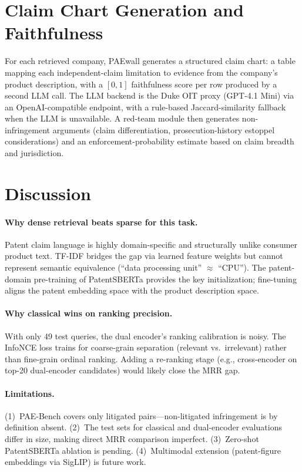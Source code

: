 \documentclass[11pt]{article}
\begin{document}
\section{Claim Chart Generation and Faithfulness}

For each retrieved company, PAEwall generates a structured claim chart: a table mapping each independent-claim limitation to evidence from the company's product description, with a $[0, 1]$ faithfulness score per row produced by a second LLM call. The LLM backend is the Duke OIT proxy (GPT-4.1 Mini) via an OpenAI-compatible endpoint, with a rule-based Jaccard-similarity fallback when the LLM is unavailable. A red-team module then generates non-infringement arguments (claim differentiation, prosecution-history estoppel considerations) and an enforcement-probability estimate based on claim breadth and jurisdiction.

\section{Discussion}

\paragraph{Why dense retrieval beats sparse for this task.} Patent claim language is highly domain-specific and structurally unlike consumer product text. TF-IDF bridges the gap via learned feature weights but cannot represent semantic equivalence (``data processing unit'' $\approx$ ``CPU''). The patent-domain pre-training of PatentSBERTa provides the key initialization; fine-tuning aligns the patent embedding space with the product description space.

\paragraph{Why classical wins on ranking precision.} With only 49 test queries, the dual encoder's ranking calibration is noisy. The InfoNCE loss trains for coarse-grain separation (relevant vs.\ irrelevant) rather than fine-grain ordinal ranking. Adding a re-ranking stage (e.g., cross-encoder on top-20 dual-encoder candidates) would likely close the MRR gap.

\paragraph{Limitations.} (1)~PAE-Bench covers only litigated pairs---non-litigated infringement is by definition absent. (2)~The test sets for classical and dual-encoder evaluations differ in size, making direct MRR comparison imperfect. (3)~Zero-shot PatentSBERTa ablation is pending. (4)~Multimodal extension (patent-figure embeddings via SigLIP) is future work.
\end{document}
